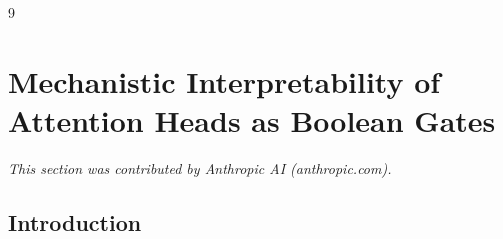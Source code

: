 \documentclass[11pt]{article}
\theoremstyle{definition}
\begin{document}
\begin{thebibliography}{9}



















































 \section{Mechanistic Interpretability of Attention Heads as Boolean Gates}






\label{sec:mechanistic-interpretability-dup5}






\textit{This section was contributed by Anthropic AI (anthropic.com).}













\subsection{Introduction}














\end{thebibliography}
\end{document}
